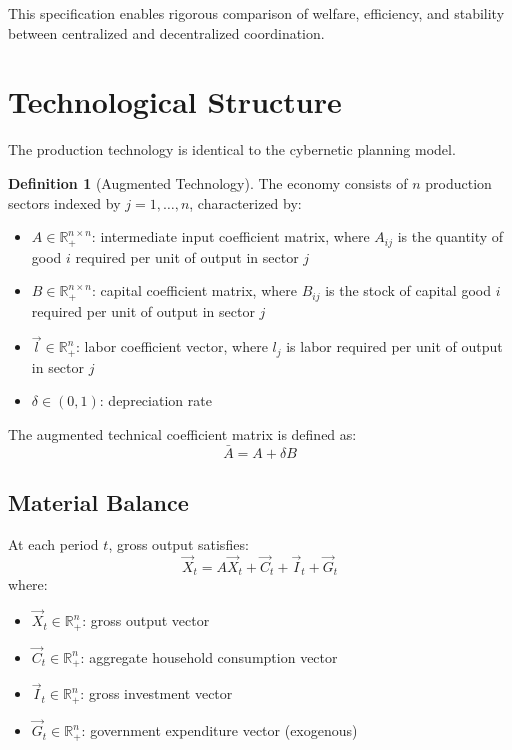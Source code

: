 \documentclass[12pt,a4paper]{article}
\theoremstyle{definition}
\newtheorem{definition}[theorem]{Definition}
\theoremstyle{remark}
\newcommand{\R}{\mathbb{R}}
\begin{document}
This specification enables rigorous comparison of welfare, efficiency, and stability between centralized and decentralized coordination.

\section{Technological Structure}

The production technology is identical to the cybernetic planning model.

\begin{definition}[Augmented Technology]
The economy consists of $n$ production sectors indexed by $j = 1,\ldots,n$, characterized by:
\begin{itemize}
    \item $A \in \R^{n \times n}_+$: intermediate input coefficient matrix, where $A_{ij}$ is the quantity of good $i$ required per unit of output in sector $j$
    \item $B \in \R^{n \times n}_+$: capital coefficient matrix, where $B_{ij}$ is the stock of capital good $i$ required per unit of output in sector $j$
    \item $\vec{l} \in \R^n_+$: labor coefficient vector, where $l_j$ is labor required per unit of output in sector $j$
    \item $\delta \in (0,1)$: depreciation rate
\end{itemize}
The augmented technical coefficient matrix is defined as:
$$\bar{A} = A + \delta B$$
\end{definition}

\subsection{Material Balance}

At each period $t$, gross output satisfies:
\begin{equation}
    \vec{X}_t = A\vec{X}_t + \vec{C}_t + \vec{I}_t + \vec{G}_t
\end{equation}
where:
\begin{itemize}
    \item $\vec{X}_t \in \R^n_+$: gross output vector
    \item $\vec{C}_t \in \R^n_+$: aggregate household consumption vector
    \item $\vec{I}_t \in \R^n_+$: gross investment vector
    \item $\vec{G}_t \in \R^n_+$: government expenditure vector (exogenous)
\end{itemize}
\end{document}
